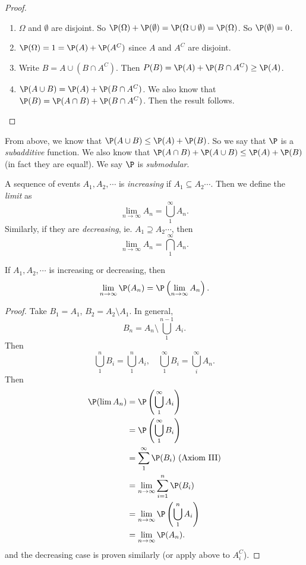 \documentclass[a4paper]{article}
\begin{document}
\begin{proof}\leavevmode
  \begin{enumerate}
    \item $\Omega$ and $\emptyset$ are disjoint. So $\P(\Omega) + \P(\emptyset) = \P(\Omega \cup \emptyset) = \P(\Omega)$. So $\P(\emptyset) = 0$.
    \item $\P(\Omega) = 1 = \P(A) + \P(A^C)$ since $A$ and $A^C$ are disjoint.
    \item Write $B = A\cup (B\cap A^C)$. Then $\\P(B) = \P(A) + \P(B\cap A^C) \geq \P(A)$.
    \item $\P(A\cup B) = \P(A) + \P(B\cap A^C)$. We also know that $\P(B) = \P(A\cap B) + \P(B\cap A^C)$. Then the result follows.
  \end{enumerate}
\end{proof}

From above, we know that $\P(A\cup B) \leq \P(A) + \P(B)$. So we say that $\P$ is a \emph{subadditive} function.  We also know that $\P(A\cap B) + \P(A \cup B) \leq \P(A) + \P(B)$ (in fact they are equal!). We say $\P$ is \emph{submodular}.

\begin{defi}
  A sequence of events $A_1, A_2, \cdots$ is \emph{increasing} if $A_1 \subseteq A_2 \cdots$. Then we define the \emph{limit} as
  \[
    \lim_{n\to \infty} A_n = \bigcup_{1}^\infty A_n.
  \]
  Similarly, if they are \emph{decreasing}, ie. $A_1\supseteq A_2\cdots$, then
  \[
    \lim_{n\to \infty} A_n = \bigcap_{1}^\infty A_n.
  \]
\end{defi}

\begin{thm}
  If $A_1, A_2, \cdots$ is increasing or decreasing, then
  \[
    \lim_{n\to \infty} \P(A_n) = \P\left(\lim_{n\to \infty} A_n\right).
  \]
\end{thm}

\begin{proof}
  Take $B_1 = A_1$, $B_2 = A_2\setminus A_1$. In general,
  \[
    B_n = A_n\setminus\bigcup_1^{n - 1}A_i.
  \]
  Then
  \[
    \bigcup_1^n B_i = \bigcup_1^n A_i,\quad \bigcup_1^\infty B_i = \bigcup _i^\infty A_n.
  \]
  Then
  \begin{align*}
    \P(\lim A_n) &= \P\left(\bigcup_1^\infty A_i\right)\\
  &= \P\left(\bigcup_1^\infty B_i\right)\\
  &=\sum_1^\infty \P(B_i)\text{ (Axiom III)}\\
  &= \lim_{n \to \infty}\sum_{i = 1}^n \P(B_i)\\
  &= \lim_{n \to \infty} \P\left(\bigcup_1^n A_i\right)\\
  &= \lim_{n \to \infty} \P(A_n).
  \end{align*}
  and the decreasing case is proven similarly (or apply above to $A_i^C$).
\end{proof}
\end{document}
